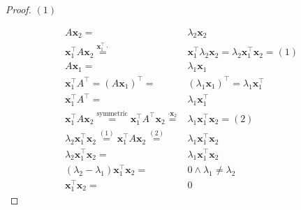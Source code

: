 \documentclass[
]{book}
\theoremstyle{definition}
\theoremstyle{definition}
\theoremstyle{definition}
\theoremstyle{definition}
\theoremstyle{remark}
\begin{document}
\begin{proof}
\(\left(1\right)\)

\[
\begin{aligned}
A\boldsymbol{x}_{{\scriptscriptstyle 2}}= & \lambda_{{\scriptscriptstyle 2}}\boldsymbol{x}_{{\scriptscriptstyle 2}}\\
\boldsymbol{x}_{{\scriptscriptstyle 1}}^{\intercal}A\boldsymbol{x}_{{\scriptscriptstyle 2}}\overset{\boldsymbol{x}_{{\scriptscriptstyle 1}}^{\intercal}\cdot}{=} & \boldsymbol{x}_{{\scriptscriptstyle 1}}^{\intercal}\lambda_{{\scriptscriptstyle 2}}\boldsymbol{x}_{{\scriptscriptstyle 2}}=\lambda_{{\scriptscriptstyle 2}}\boldsymbol{x}_{{\scriptscriptstyle 1}}^{\intercal}\boldsymbol{x}_{{\scriptscriptstyle 2}}=\left(1\right)\\
A\boldsymbol{x}_{{\scriptscriptstyle 1}}= & \lambda_{{\scriptscriptstyle 1}}\boldsymbol{x}_{{\scriptscriptstyle 1}}\\
\boldsymbol{x}_{{\scriptscriptstyle 1}}^{\intercal}A^{\intercal}=\left(A\boldsymbol{x}_{{\scriptscriptstyle 1}}\right)^{\intercal}= & \left(\lambda_{{\scriptscriptstyle 1}}\boldsymbol{x}_{{\scriptscriptstyle 1}}\right)^{\intercal}=\lambda_{{\scriptscriptstyle 1}}\boldsymbol{x}_{{\scriptscriptstyle 1}}^{\intercal}\\
\boldsymbol{x}_{{\scriptscriptstyle 1}}^{\intercal}A^{\intercal}= & \lambda_{{\scriptscriptstyle 1}}\boldsymbol{x}_{{\scriptscriptstyle 1}}^{\intercal}\\
\boldsymbol{x}_{{\scriptscriptstyle 1}}^{\intercal}A\boldsymbol{x}_{{\scriptscriptstyle 2}}\overset{\text{symmetric}}{=}\boldsymbol{x}_{{\scriptscriptstyle 1}}^{\intercal}A^{\intercal}\boldsymbol{x}_{{\scriptscriptstyle 2}}\overset{\cdot\boldsymbol{x}_{{\scriptscriptstyle 2}}}{=} & \lambda_{{\scriptscriptstyle 1}}\boldsymbol{x}_{{\scriptscriptstyle 1}}^{\intercal}\boldsymbol{x}_{{\scriptscriptstyle 2}}=\left(2\right)\\
\lambda_{{\scriptscriptstyle 2}}\boldsymbol{x}_{{\scriptscriptstyle 1}}^{\intercal}\boldsymbol{x}_{{\scriptscriptstyle 2}}\overset{\left(1\right)}{=}\boldsymbol{x}_{{\scriptscriptstyle 1}}^{\intercal}A\boldsymbol{x}_{{\scriptscriptstyle 2}}\overset{\left(2\right)}{=} & \lambda_{{\scriptscriptstyle 1}}\boldsymbol{x}_{{\scriptscriptstyle 1}}^{\intercal}\boldsymbol{x}_{{\scriptscriptstyle 2}}\\
\lambda_{{\scriptscriptstyle 2}}\boldsymbol{x}_{{\scriptscriptstyle 1}}^{\intercal}\boldsymbol{x}_{{\scriptscriptstyle 2}}= & \lambda_{{\scriptscriptstyle 1}}\boldsymbol{x}_{{\scriptscriptstyle 1}}^{\intercal}\boldsymbol{x}_{{\scriptscriptstyle 2}}\\
\left(\lambda_{{\scriptscriptstyle 2}}-\lambda_{{\scriptscriptstyle 1}}\right)\boldsymbol{x}_{{\scriptscriptstyle 1}}^{\intercal}\boldsymbol{x}_{{\scriptscriptstyle 2}}= & 0\wedge\lambda_{{\scriptscriptstyle 1}}\ne\lambda_{{\scriptscriptstyle 2}}\\
\boldsymbol{x}_{{\scriptscriptstyle 1}}^{\intercal}\boldsymbol{x}_{{\scriptscriptstyle 2}}= & 0
\end{aligned}
\]
\end{proof}
\end{document}
